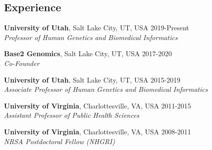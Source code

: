 \documentclass[margin,line]{cv}
\begin{document}
\begin{resume}
    \section{\mysidestyle Experience}

    \textbf{University of Utah}, Salt Lake City, UT, USA                               \hfill   2019-Present\\
    \textit{Professor of Human Genetics and Biomedical Informatics}                                         

    \textbf{Base2 Genomics}, Salt Lake City, UT, USA                                        \hfill 2017-2020\\
    \textit{Co-Founder}                                                                                     

    \textbf{University of Utah}, Salt Lake City, UT, USA                                   \hfill 2015-2019\\
    \textit{Associate Professor of Human Genetics and Biomedical Informatics}                              

    \textbf{University of Virginia}, Charlottesville, VA, USA                              \hfill 2011-2015\\
    \textit{Assistant Professor of Public Health Sciences}                              

    \textbf{University of Virginia}, Charlottesville, VA, USA                              \hfill 2008-2011\\
    \textit{NRSA Postdoctoral Fellow (NHGRI)}                                          


\end{resume}
\end{document}
